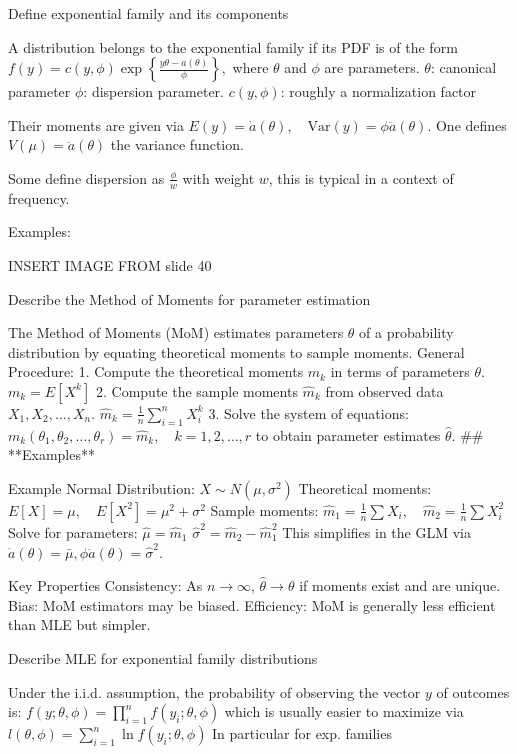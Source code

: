 \documentclass[11pt,a4paper,twoside]{article}
\begin{document}
Define exponential family and its components

A distribution belongs to the exponential family if its PDF is of the form
\(
f(y) = c(y, \phi) \exp \left\{ \frac{y\theta - a(\theta)}{\phi} \right\},
\)
where \(\theta\) and \(\phi\) are parameters. 
\(\theta\): canonical parameter 
\(\phi\): dispersion parameter. 
\( c(y, \phi) \): roughly a normalization factor

Their moments are given via
\( E(y) = \dot{a}(\theta), \quad \text{Var}(y) = \phi \ddot{a}(\theta) \).
One defines \( V(\mu) = \ddot{a}(\theta) \) the variance function.

Some define dispersion as \( \frac{\phi}{w} \) with weight \( w \), this is typical in a context of frequency.

Examples:

INSERT IMAGE FROM slide 40 


Describe the Method of Moments for parameter estimation

The Method of Moments (MoM) estimates parameters \(\theta\) of a probability distribution by equating theoretical moments to sample moments.  
General Procedure:
1. Compute the theoretical moments \( m_k \) in terms of parameters \( \theta \).  
\(
m_k = E[X^k]
\)
2. Compute the sample moments \( \hat{m}_k \) from observed data \( X_1, X_2, ..., X_n \).  
\(
\hat{m}_k = \frac{1}{n} \sum_{i=1}^{n} X_i^k
\)
3. Solve the system of equations: 
\(m_k(\theta_1, \theta_2, \dots, \theta_r) = \hat{m}_k, \quad k = 1, 2, \dots, r\) 
to obtain parameter estimates \( \hat{\theta} \).
## **Examples**  

Example Normal Distribution:
\( X \sim N(\mu, \sigma^2) \)  
Theoretical moments:  
\(
E[X] = \mu, \quad E[X^2] = \mu^2 + \sigma^2
\)
Sample moments:  
\(
\hat{m}_1 = \frac{1}{n} \sum X_i, \quad \hat{m}_2 = \frac{1}{n} \sum X_i^2
\)
Solve for parameters:  
\(
\hat{\mu} = \hat{m}_1
\)
\(
\hat{\sigma}^2 = \hat{m}_2 - \hat{m}_1^2
\)
This simplifies in the GLM via \( \dot{a}(\theta) = \bar{\mu}, \phi\ddot{a}(\theta) = \hat{\sigma}^2 \).

Key Properties
Consistency: As \( n \to \infty \), \( \hat{\theta} \to \theta \) if moments exist and are unique.  
Bias: MoM estimators may be biased.  
Efficiency: MoM is generally less efficient than MLE but simpler.  


Describe MLE for exponential family distributions

Under the i.i.d. assumption, the probability of observing the vector \( y \) of outcomes is:
\( f(y; \theta, \phi) = \prod_{i=1}^n f(y_i;\theta,\phi) \)
which is usually easier to maximize via
\( l(\theta, \phi) = \sum^n_{i=1} \ln f(y_i;\theta,\phi) \)
In particular for exp. families
\end{document}
